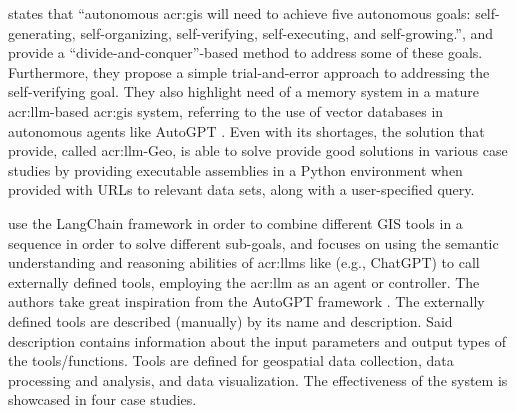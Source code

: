 \cite{liAutonomousGISNextgeneration2023} states that “autonomous \acrshort{acr:gis} will need to achieve five autonomous goals: self-generating, self-organizing, self-verifying, self-executing, and self-growing.”, and provide a “divide-and-conquer”-based method to address some of these goals. Furthermore, they propose a simple trial-and-error approach to addressing the self-verifying goal. They also highlight need of a memory system in a mature \gls{acr:llm}-based \gls{acr:gis} system, referring to the use of vector databases in autonomous agents like AutoGPT \citep{richardAutoGPTHeartOpensource2023}. Even with its shortages, the solution that \citep{liAutonomousGISNextgeneration2023} provide, called \acrshort{acr:llm}-Geo, is able to solve provide good solutions in various case studies by providing executable assemblies in a Python environment when provided with URLs to relevant data sets, along with a user-specified query.

\cite{zhangGeoGPTUnderstandingProcessing2023} use the LangChain framework \citep{chaseLangChain2022} in order to combine different GIS tools in a sequence in order to solve different sub-goals, and focuses on using the semantic understanding and reasoning abilities of \glspl{acr:llm} like (e.g., ChatGPT) to call externally defined tools, employing the \gls{acr:llm} as an agent or controller. The authors take great inspiration from the AutoGPT framework \citep{richardAutoGPTHeartOpensource2023}. The externally defined tools are described (manually) by its name and description. Said description contains information about the input parameters and output types of the tools/functions. Tools are defined for geospatial data collection, data processing and analysis, and data visualization. The effectiveness of the system is showcased in four case studies.

